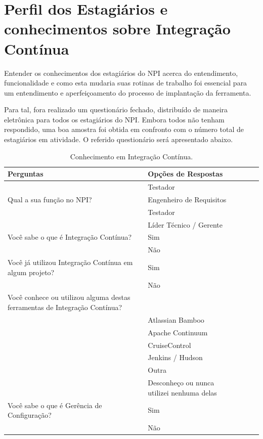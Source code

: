 \section{Perfil dos Estagiários e conhecimentos sobre Integração Contínua}\label{perfil-estagiarios}
Entender os conhecimentos dos estagiários do NPI acerca do entendimento, funcionalidade e como esta mudaria suas rotinas de trabalho foi essencial para um entendimento e aperfeiçoamento do processo de implantação da ferramenta.

Para tal, fora realizado um questionário fechado, distribuído de maneira eletrônica para todos os estagiários do NPI. Embora todos não tenham respondido, uma boa amostra foi obtida em confronto com o número total de estagiários em atividade. O referido questionário será apresentado abaixo.

\pagebreak
\begin{table}[htb]
\centering
\caption[Conhecimentos em Integração Contínua]{Conhecimento em Integração Contínua.}
\label{tab-ic}
\begin{tabular}{p{5.0cm}l|p{5.0cm}|p{5.40cm}|p{5.40cm}}
  \hline
   \textbf{Perguntas} & \textbf{Opções de Respostas}\\
    \hline
    & Testador \\
    Qual a sua função no NPI? & Engenheiro de Requisitos \\
    & Testador \\
    & Líder Técnico / Gerente \\
    \hline
    Você sabe o que é Integração Contínua? & Sim \\
    & Não \\
    \hline
    Você já utilizou Integração Contínua em algum projeto? & Sim \\
    & Não \\
    \hline
    Você conhece ou utilizou alguma destas ferramentas de Integração Contínua?  & \\
    & Atlassian Bamboo \\
    & Apache Continuum \\
    & CruiseControl \\
    & Jenkins / Hudson \\
    & Outra \\
    & Desconheço ou nunca utilizei nenhuma delas \\
	\hline
	Você sabe o que é Gerência de Configuração? & Sim \\
	& Não \\
	\hline
\end{tabular}
\end{table}

